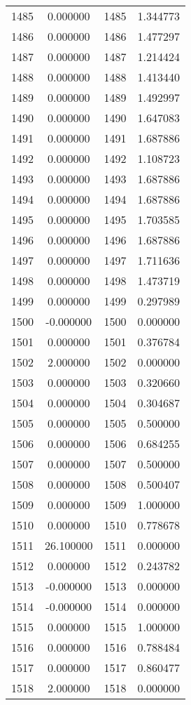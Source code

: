 \documentclass[12pt]{article}
\begin{document}
\begin{longtable}{@{}cccc@{}}
1485 & 0.000000 & 1485 & 1.344773 \\
1486 & 0.000000 & 1486 & 1.477297 \\
1487 & 0.000000 & 1487 & 1.214424 \\
1488 & 0.000000 & 1488 & 1.413440 \\
1489 & 0.000000 & 1489 & 1.492997 \\
1490 & 0.000000 & 1490 & 1.647083 \\
1491 & 0.000000 & 1491 & 1.687886 \\
1492 & 0.000000 & 1492 & 1.108723 \\
1493 & 0.000000 & 1493 & 1.687886 \\
1494 & 0.000000 & 1494 & 1.687886 \\
1495 & 0.000000 & 1495 & 1.703585 \\
1496 & 0.000000 & 1496 & 1.687886 \\
1497 & 0.000000 & 1497 & 1.711636 \\
1498 & 0.000000 & 1498 & 1.473719 \\
1499 & 0.000000 & 1499 & 0.297989 \\
1500 & -0.000000 & 1500 & 0.000000 \\
1501 & 0.000000 & 1501 & 0.376784 \\
1502 & 2.000000 & 1502 & 0.000000 \\
1503 & 0.000000 & 1503 & 0.320660 \\
1504 & 0.000000 & 1504 & 0.304687 \\
1505 & 0.000000 & 1505 & 0.500000 \\
1506 & 0.000000 & 1506 & 0.684255 \\
1507 & 0.000000 & 1507 & 0.500000 \\
1508 & 0.000000 & 1508 & 0.500407 \\
1509 & 0.000000 & 1509 & 1.000000 \\
1510 & 0.000000 & 1510 & 0.778678 \\
1511 & 26.100000 & 1511 & 0.000000 \\
1512 & 0.000000 & 1512 & 0.243782 \\
1513 & -0.000000 & 1513 & 0.000000 \\
1514 & -0.000000 & 1514 & 0.000000 \\
1515 & 0.000000 & 1515 & 1.000000 \\
1516 & 0.000000 & 1516 & 0.788484 \\
1517 & 0.000000 & 1517 & 0.860477 \\
1518 & 2.000000 & 1518 & 0.000000 \\

\end{longtable}
\end{document}
